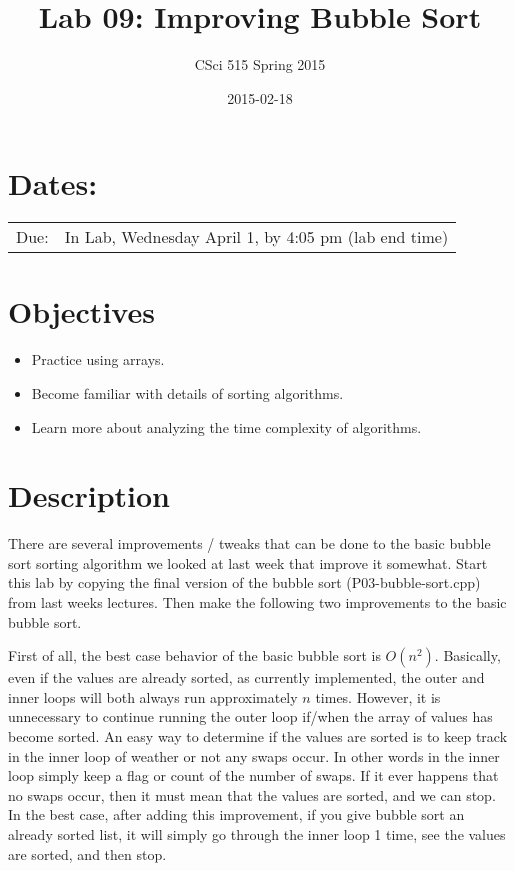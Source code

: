 \documentclass[11pt]{article}
\title{Lab 09: Improving Bubble Sort}
\author{CSci 515 Spring 2015}
\date{2015-02-18}
\begin{document}
\maketitle


\section*{Dates:}
\label{sec-1}


\begin{center}
\begin{tabular}{ll}
 Due:  &  In Lab, Wednesday April 1, by 4:05 pm (lab end time)  \\
\end{tabular}
\end{center}
\section*{Objectives}
\label{sec-2}

\begin{itemize}
\item Practice using arrays.
\item Become familiar with details of sorting algorithms.
\item Learn more about analyzing the time complexity of algorithms.
\end{itemize}
\section*{Description}
\label{sec-3}

There are several improvements / tweaks that can be done to the basic
bubble sort sorting algorithm we looked at last week that improve it
somewhat.  Start this lab by copying the final version of the bubble
sort (P03-bubble-sort.cpp) from last weeks lectures.  Then make the
following two improvements to the basic bubble sort.

First of all, the best case behavior of the basic bubble sort is
$O(n^2)$.  Basically, even if the values are already sorted, as
currently implemented, the outer and inner loops will both always run
approximately $n$ times.  However, it is unnecessary to continue
running the outer loop if/when the array of values has become sorted.
An easy way to determine if the values are sorted is to keep track in
the inner loop of weather or not any swaps occur.  In other words in
the inner loop simply keep a flag or count of the number of swaps.  If
it ever happens that no swaps occur, then it must mean that the values
are sorted, and we can stop.  In the best case, after adding this
improvement, if you give bubble sort an already sorted list, it will
simply go through the inner loop 1 time, see the values are sorted,
and then stop.
\end{document}
